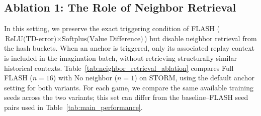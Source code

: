 \documentclass{article} %
\begin{document}
\subsection{Ablation 1: The Role of Neighbor Retrieval}
In this setting, we preserve the exact triggering condition of FLASH ($\text{ReLU(TD-error)} \times \text{Softplus(Value Difference)}$) but disable neighbor retrieval from the hash buckets. When an anchor is triggered, only its associated replay context is included in the imagination batch, without retrieving structurally similar historical contexts. Table~\ref{tab:neighbor_retrieval_ablation} compares Full FLASH ($n=16$) with No neighbor ($n=1$) on STORM, using the default anchor setting for both variants. For each game, we compare the same available training seeds across the two variants; this set can differ from the baseline--FLASH seed pairs used in Table~\ref{tab:main_performance}.
\end{document}
